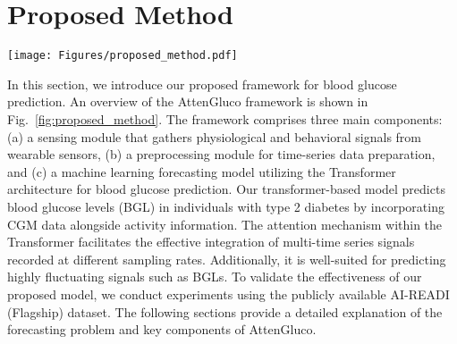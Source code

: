 \section{Proposed Method}
\begin{figure*}[t]
    \centering    \texttt{[image: Figures/proposed\_method.pdf]}
    \caption{\small Overview of the AttenGluco framework including sensing module, data preparation, and forecasting model.}
    \label{fig:proposed_method}
\end{figure*}

In this section, we introduce our proposed framework for blood glucose prediction. An overview of the AttenGluco framework is shown in Fig.~\ref{fig:proposed_method}. The framework comprises three main components: (a) a sensing module that gathers physiological and behavioral signals from wearable sensors, (b) a preprocessing module for time-series data preparation, and (c) a machine learning forecasting model utilizing the Transformer architecture for blood glucose prediction. Our transformer-based model predicts blood glucose levels (BGL) in individuals with type 2 diabetes by incorporating CGM data alongside activity information.
The attention mechanism within the Transformer facilitates the effective integration of multi-time series signals recorded at different sampling rates. Additionally, it is well-suited for predicting highly fluctuating signals such as BGLs. To validate the effectiveness of our proposed model, we conduct experiments using the publicly available AI-READI (Flagship) dataset. The following sections provide a detailed explanation of the forecasting problem and key components of AttenGluco.

